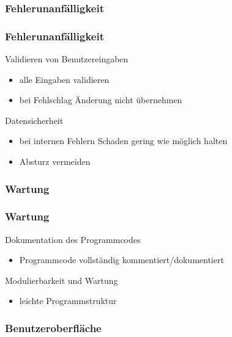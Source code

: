 \documentclass{beamer}
\begin{document}
\subsubsection{Fehlerunanfälligkeit}

\begin{frame}
\frametitle{Fehlerunanfälligkeit}

\begin{block}{Validieren von Benutzereingaben}
\begin{itemize}
\item alle Eingaben validieren
\item bei Fehlschlag Änderung nicht übernehmen
\end{itemize}
\end{block}

\begin{block}{Datensicherheit}
\begin{itemize}
\item bei internen Fehlern Schaden gering wie möglich halten
\item Absturz vermeiden
\end{itemize}
\end{block}

\end{frame}

\subsubsection{Wartung}

\begin{frame}
\frametitle{Wartung}

\begin{block}{Dokumentation des Programmcodes}
\begin{itemize}
\item Programmcode vollständig kommentiert/dokumentiert
\end{itemize}
\end{block}

\begin{block}{Modulierbarkeit und Wartung}
\begin{itemize}
\item leichte Programmstruktur
\end{itemize}
\end{block}

\end{frame}

\subsubsection{Benutzeroberfläche}
\end{document}
